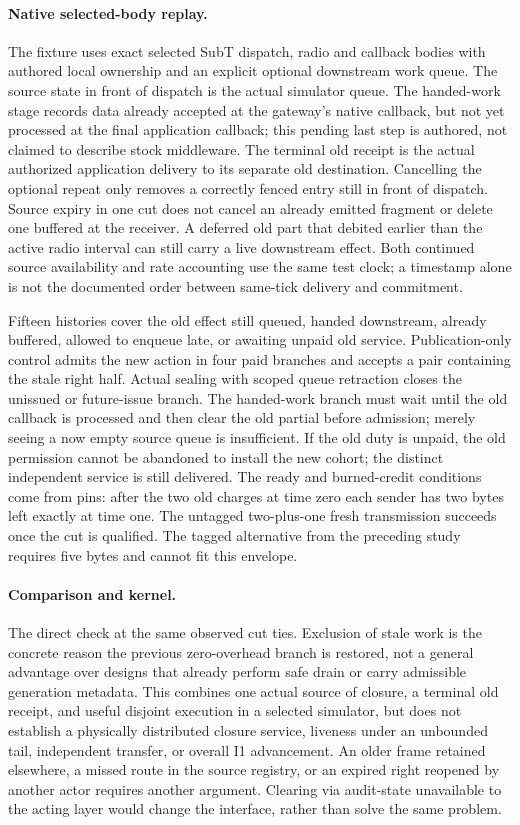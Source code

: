 \documentclass{article}
\begin{document}
\paragraph{Native selected-body replay.}
The fixture uses exact selected SubT dispatch, radio and callback bodies
with authored local ownership and an explicit optional downstream work
queue. The source state in front of dispatch is the actual simulator queue.
The handed-work stage records data already accepted at the gateway's
native callback, but not yet processed at the final application callback;
this pending last step is authored, not claimed to describe stock
middleware. The terminal old receipt is the actual authorized application
delivery to its separate old destination. Cancelling the optional repeat
only removes a correctly fenced entry still in front of dispatch.
Source expiry in one cut does not cancel an already emitted fragment or
delete one buffered at the receiver. A deferred old part that debited
earlier than the active radio interval can still carry a live downstream
effect. Both continued source availability and rate accounting use the
same test clock; a timestamp alone is not the documented order between
same-tick delivery and commitment.

Fifteen histories cover the old effect still queued, handed downstream,
already buffered, allowed to enqueue late, or awaiting unpaid old service.
Publication-only control admits the new action in four paid branches and
accepts a pair containing the stale right half. Actual sealing with
scoped queue retraction closes the unissued or future-issue branch.
The handed-work branch must wait until the old callback is processed
and then clear the old partial before admission; merely seeing a now empty
source queue is insufficient. If the old duty is unpaid, the old
permission cannot be abandoned to install the new cohort; the distinct
independent service is still delivered. The ready and burned-credit
conditions come from pins: after the two old charges at time zero each
sender has two bytes left exactly at time one. The untagged two-plus-one
fresh transmission succeeds once the cut is qualified. The tagged
alternative from the preceding study requires five bytes and cannot fit
this envelope.

\paragraph{Comparison and kernel.}
The direct check at the same observed cut ties. Exclusion of stale work
is the concrete reason the previous zero-overhead branch is restored,
not a general advantage over designs that already perform safe drain
or carry admissible generation metadata. This combines one actual
source of closure, a terminal old receipt, and useful disjoint execution
in a selected simulator, but does not establish a physically distributed
closure service, liveness under an unbounded tail, independent transfer,
or overall I1 advancement. An older frame retained elsewhere, a missed
route in the source registry, or an expired right reopened by another
actor requires another argument. Clearing via audit-state unavailable to
the acting layer would change the interface, rather than solve the same
problem.
\end{document}
